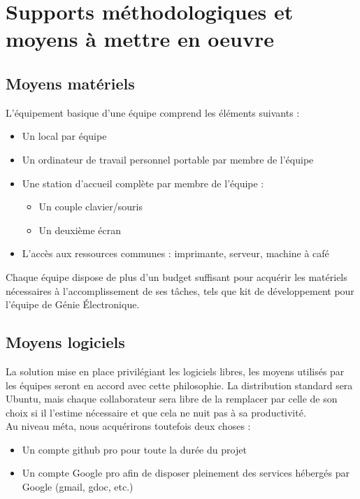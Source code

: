 \section{Supports méthodologiques et moyens à mettre en oeuvre}

\subsection{Moyens matériels}

L'équipement basique d'une équipe comprend les éléments suivants : 

\begin{itemize}
\item Un local par équipe
\item Un ordinateur de travail personnel portable par membre de l'équipe
\item Une station d'accueil complète par membre de l'équipe :
    \begin{itemize}
    \item Un couple clavier/souris
    \item Un deuxième écran
    \end{itemize}
\item L'accès aux ressources communes : imprimante, serveur, machine à café
\end{itemize}

\vskip 6pt

Chaque équipe dispose de plus d'un budget suffisant pour acquérir les matériels
nécessaires à l'accomplissement de ses tâches, tels que kit de
développement pour l'équipe de Génie Électronique.

\subsection{Moyens logiciels}

La solution mise en place privilégiant les logiciels libres, les moyens
utilisés par les équipes seront en accord avec cette philosophie. La
distribution standard sera Ubuntu, mais chaque collaborateur sera libre de
la remplacer par celle de son choix si il l'estime nécessaire et que cela
ne nuit pas à sa productivité.\\

Au niveau méta, nous acquérirons toutefois deux choses :
\begin{itemize}
\item Un compte github pro pour toute la durée du projet
\item Un compte Google pro afin de disposer pleinement des services
hébergés par Google (gmail, gdoc, etc.)
\end{itemize}

